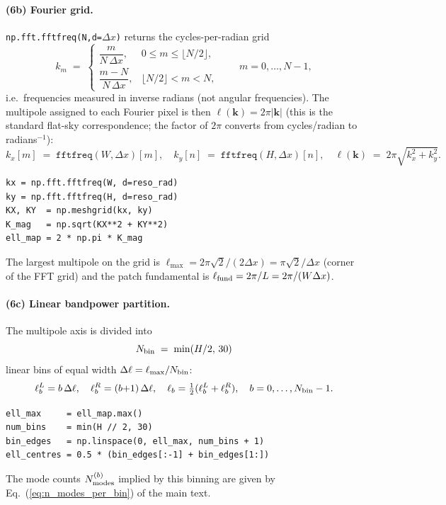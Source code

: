\documentclass[11pt]{article}
\theoremstyle{definition}
\begin{document}
\paragraph{(6b) Fourier grid.} \texttt{np.fft.fftfreq(N,d=$\Delta x$)} returns
the cycles-per-radian grid
\begin{equation}
  k_m \;=\; \begin{cases}
    \dfrac{m}{N\,\Delta x}, & 0 \le m \le \lfloor N/2\rfloor,\\[0.3em]
    \dfrac{m-N}{N\,\Delta x}, & \lfloor N/2\rfloor < m < N,
  \end{cases}
  \qquad m=0,\ldots,N-1,
\end{equation}
i.e.\ frequencies measured in inverse radians (not angular frequencies). The
multipole assigned to each Fourier pixel is then $\ell(\bm k) = 2\pi|\bm k|$
(this is the standard flat-sky correspondence; the factor of $2\pi$ converts
from cycles/radian to radians$^{-1}$):
\begin{equation}
  k_x[m] \;=\; \texttt{fftfreq}(W,\Delta x)[m],\quad
  k_y[n] \;=\; \texttt{fftfreq}(H,\Delta x)[n],\quad
  \ell(\bm k) \;=\; 2\pi\sqrt{k_x^2+k_y^2}.
  \label{eq:ell_map}
\end{equation}
\begin{lstlisting}[style=nb]
kx = np.fft.fftfreq(W, d=reso_rad)
ky = np.fft.fftfreq(H, d=reso_rad)
KX, KY  = np.meshgrid(kx, ky)
K_mag   = np.sqrt(KX**2 + KY**2)
ell_map = 2 * np.pi * K_mag
\end{lstlisting}
The largest multipole on the grid is $\ell_{\max} = 2\pi\sqrt{2}/(2\Delta x)
= \pi\sqrt{2}/\Delta x$ (corner of the FFT grid) and the patch fundamental is
$\ell_{\rm fund} = 2\pi/L = 2\pi/(W\Delta x)$.

\paragraph{(6c) Linear bandpower partition.} The multipole axis is divided
into
\begin{equation}
  N_{\rm bin} \;=\; \min(H/2,\,30)
\end{equation}
linear bins of equal width $\Delta\ell=\ell_{\max}/N_{\rm bin}$:
\begin{equation}
  \ell_b^L = b\,\Delta\ell,\quad
  \ell_b^R = (b{+}1)\,\Delta\ell,\quad
  \ell_b   = \tfrac12(\ell_b^L+\ell_b^R),\quad
  b=0,\ldots,N_{\rm bin}-1.
  \label{eq:linear_bins_estim}
\end{equation}
\begin{lstlisting}[style=nb]
ell_max     = ell_map.max()
num_bins    = min(H // 2, 30)
bin_edges   = np.linspace(0, ell_max, num_bins + 1)
ell_centres = 0.5 * (bin_edges[:-1] + bin_edges[1:])
\end{lstlisting}
The mode counts $N^{(b)}_{\rm modes}$ implied by this binning are given by
Eq.~(\ref{eq:n_modes_per_bin}) of the main text.
\end{document}
